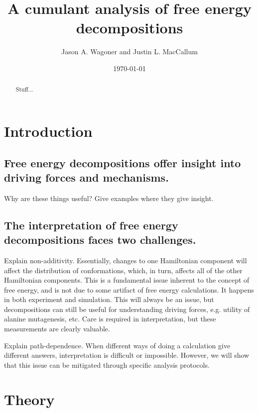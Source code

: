 \documentclass{article}
\begin{document}
\title{A cumulant analysis of free energy decompositions}
\author{Jason A. Wagoner and Justin L. MacCallum}

\date{ \today}

\maketitle

\begin{abstract}
Stuff...
\end{abstract}

\section{Introduction}

\subsection{Free energy decompositions offer insight into driving forces and mechanisms.}

Why are these things useful? Give examples where they give insight.




\subsection{The interpretation of free energy decompositions faces two challenges.}

Explain non-additivity. Essentially, changes to one Hamiltonian component will affect the distribution of conformations, which, in turn, affects all of the other Hamiltonian components. This is a fundamental issue inherent to the concept of free energy, and is not due to some artifact of free energy calculations. It happens in both experiment and simulation. This will always be an issue, but decompositions can still be useful for understanding driving forces, e.g. utility of alanine mutagenesis, etc. Care is required in interpretation, but these measurements are clearly valuable.

Explain path-dependence. When different ways of doing a calculation give different answers, interpretation is difficult or impossible. However, we will show that this issue can be mitigated through specific analysis protocols.




\section{Theory}
\end{document}
